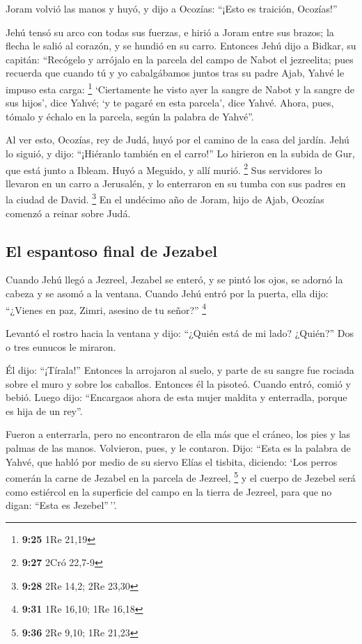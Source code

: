  Joram volvió las manos y huyó, y dijo a Ocozías: ``¡Esto
es traición, Ocozías!''

 Jehú tensó su arco con todas sus fuerzas, e hirió a
Joram entre sus brazos; la flecha le salió al corazón, y se hundió en su
carro.  Entonces Jehú dijo a Bidkar, su capitán:
``Recógelo y arrójalo en la parcela del campo de Nabot el jezreelita;
pues recuerda que cuando tú y yo cabalgábamos juntos tras su padre Ajab,
Yahvé le impuso esta carga: \footnote{\textbf{9:25} 1Re 21,19}
 `Ciertamente he visto ayer la sangre de Nabot y la
sangre de sus hijos', dice Yahvé; `y te pagaré en esta parcela', dice
Yahvé. Ahora, pues, tómalo y échalo en la parcela, según la palabra de
Yahvé''.

 Al ver esto, Ocozías, rey de Judá, huyó por el camino de
la casa del jardín. Jehú lo siguió, y dijo: ``¡Hiéranlo también en el
carro!'' Lo hirieron en la subida de Gur, que está junto a Ibleam. Huyó
a Meguido, y allí murió. \footnote{\textbf{9:27} 2Cró 22,7-9}
 Sus servidores lo llevaron en un carro a Jerusalén, y lo
enterraron en su tumba con sus padres en la ciudad de David. \footnote{\textbf{9:28}
  2Re 14,2; 2Re 23,30}  En el undécimo año de Joram, hijo
de Ajab, Ocozías comenzó a reinar sobre Judá.

\hypertarget{el-espantoso-final-de-jezabel}{%
\subsection{El espantoso final de
Jezabel}\label{el-espantoso-final-de-jezabel}}

 Cuando Jehú llegó a Jezreel, Jezabel se enteró, y se
pintó los ojos, se adornó la cabeza y se asomó a la ventana.
 Cuando Jehú entró por la puerta, ella dijo: ``¿Vienes en
paz, Zimri, asesino de tu señor?'' \footnote{\textbf{9:31} 1Re 16,10;
  1Re 16,18}

 Levantó el rostro hacia la ventana y dijo: ``¿Quién está
de mi lado? ¿Quién?'' Dos o tres eunucos le miraron.

 Él dijo: ``¡Tírala!'' Entonces la arrojaron al suelo, y
parte de su sangre fue rociada sobre el muro y sobre los caballos.
Entonces él la pisoteó.  Cuando entró, comió y bebió.
Luego dijo: ``Encargaos ahora de esta mujer maldita y enterradla, porque
es hija de un rey''.

 Fueron a enterrarla, pero no encontraron de ella más que
el cráneo, los pies y las palmas de las manos. 
Volvieron, pues, y le contaron. Dijo: ``Esta es la palabra de Yahvé, que
habló por medio de su siervo Elías el tisbita, diciendo: `Los perros
comerán la carne de Jezabel en la parcela de Jezreel, \footnote{\textbf{9:36}
  2Re 9,10; 1Re 21,23}  y el cuerpo de Jezebel será como
estiércol en la superficie del campo en la tierra de Jezreel, para que
no digan: ``Esta es Jezebel''\,''.

